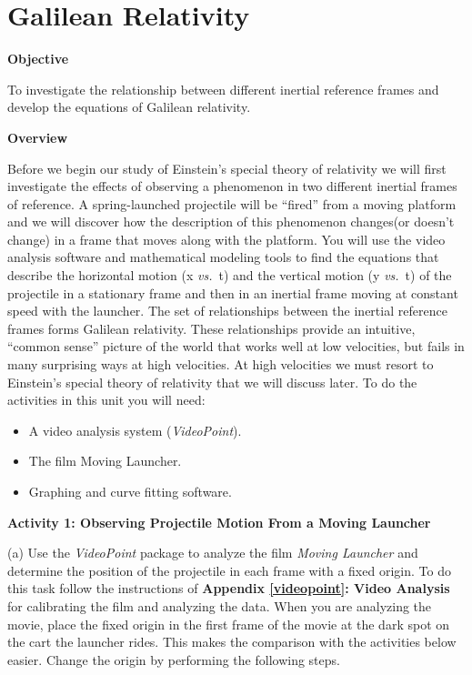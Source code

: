 
\section{Galilean Relativity}

\makelabheader %

\textbf{Objective }

To investigate the relationship between different inertial reference
frames and develop the equations of Galilean relativity.

\textbf{Overview}

Before we begin our study of Einstein's special theory of relativity
we will first investigate the effects of observing a phenomenon in
two different inertial frames of reference. A spring-launched projectile
will be {}``fired'' from a moving platform and we will discover
how the description of this phenomenon changes(or doesn't change)
in a frame that moves along with the platform. You will use the video
analysis software and mathematical modeling tools to find the equations
that describe the horizontal motion (x \textit{vs.}~t) and the vertical motion
(y \textit{vs.}~t) of the projectile in a stationary frame and then in an inertial
frame moving at constant speed with the launcher. The set of relationships
between the inertial reference frames forms Galilean relativity. These
relationships provide an intuitive, {}``common sense'' picture of
the world that works well at low velocities, but fails in many surprising
ways at high velocities. At high velocities we must resort to Einstein's
special theory of relativity that we will discuss later. To do the
activities in this unit you will need:

\begin{itemize}
\item A video analysis system (\emph{VideoPoint}).
\item The film Moving Launcher.
\item Graphing and curve fitting software.
\end{itemize}
\textbf{Activity 1: Observing Projectile Motion From a Moving Launcher}

(a) Use the \emph{VideoPoint} package to analyze the film \emph{Moving
Launcher} and determine the position of the projectile in each frame
with a fixed origin. To do this task follow the instructions of \textbf{Appendix
\ref{videopoint}: Video Analysis} for calibrating the film and analyzing the data.
When you are analyzing the movie, place the fixed origin in the first
frame of the movie at the dark spot on the cart the launcher rides.
This makes the comparison with the activities below easier. Change
the origin by performing the following steps.

